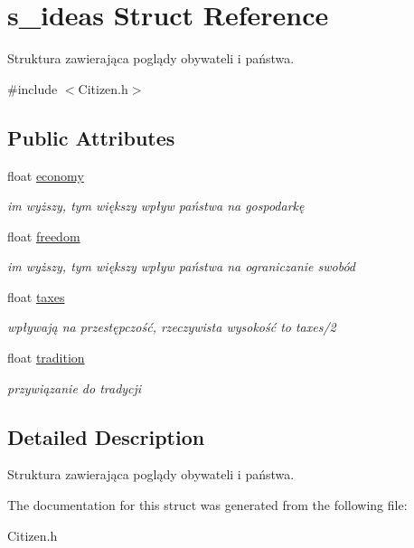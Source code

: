 \hypertarget{structs__ideas}{\section{s\+\_\+ideas Struct Reference}
\label{structs__ideas}
}


Struktura zawierająca poglądy obywateli i państwa.  




{\ttfamily \#include $<$Citizen.\+h$>$}

\subsection*{Public Attributes}
\begin{DoxyCompactItemize}
\item 
\hypertarget{structs__ideas_a53d529ca607242cc14489be033474c9e}{float \hyperlink{structs__ideas_a53d529ca607242cc14489be033474c9e}{economy}}\label{structs__ideas_a53d529ca607242cc14489be033474c9e}

\begin{DoxyCompactList}\small\item\em im wyższy, tym większy wpływ państwa na gospodarkę \end{DoxyCompactList}\item 
\hypertarget{structs__ideas_aaf9154f9e53f7959eb3e046181770035}{float \hyperlink{structs__ideas_aaf9154f9e53f7959eb3e046181770035}{freedom}}\label{structs__ideas_aaf9154f9e53f7959eb3e046181770035}

\begin{DoxyCompactList}\small\item\em im wyższy, tym większy wpływ państwa na ograniczanie swobód \end{DoxyCompactList}\item 
\hypertarget{structs__ideas_ab0121973d39415038d9acc8169dde4c1}{float \hyperlink{structs__ideas_ab0121973d39415038d9acc8169dde4c1}{taxes}}\label{structs__ideas_ab0121973d39415038d9acc8169dde4c1}

\begin{DoxyCompactList}\small\item\em wpływają na przestępczość, rzeczywista wysokość to taxes/2 \end{DoxyCompactList}\item 
\hypertarget{structs__ideas_aed8682e418bc2d5619269a1017c98382}{float \hyperlink{structs__ideas_aed8682e418bc2d5619269a1017c98382}{tradition}}\label{structs__ideas_aed8682e418bc2d5619269a1017c98382}

\begin{DoxyCompactList}\small\item\em przywiązanie do tradycji \end{DoxyCompactList}\end{DoxyCompactItemize}


\subsection{Detailed Description}
Struktura zawierająca poglądy obywateli i państwa. 

The documentation for this struct was generated from the following file\+:\begin{DoxyCompactItemize}
\item 
Citizen.\+h\end{DoxyCompactItemize}
